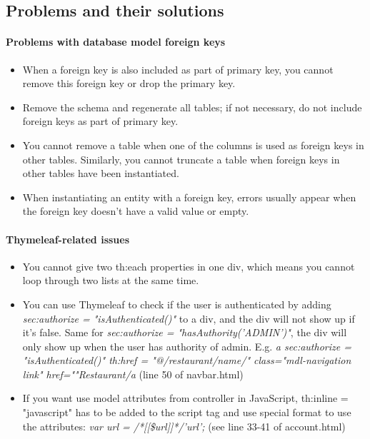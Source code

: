 \documentclass[12pt]{article}
\begin{document}
\subsection{Problems and their solutions}
\paragraph{Problems with database model foreign keys}
\begin{itemize}
	\item When a foreign key is also included as part of primary key, you cannot remove this foreign key or drop the primary key.
	\item Remove the schema and regenerate all tables; if not necessary, do not include foreign keys as part of primary key.
	\item You cannot remove a table when one of the columns is used as foreign keys in other tables. Similarly, you cannot truncate a table when foreign keys in other tables have been instantiated.
	\item When instantiating an entity with a foreign key, errors usually appear when the foreign key doesn't have a valid value or empty.
\end{itemize}

\paragraph{Thymeleaf-related issues}
\begin{itemize}
	\item You cannot give two th:each properties in one div, which means you cannot loop through two lists at the same time.
	\item You can use Thymeleaf to check if the user is authenticated by adding \textit{sec:authorize = "isAuthenticated()"} to a div, and the div will not show up if it’s false. Same for \textit{sec:authorize = "hasAuthority('ADMIN')"}, the div will only show up when the user has authority of admin. E.g. \textit{\textlangle a sec:authorize = "isAuthenticated()" th:href = "@{/restaurant/name/}" class="mdl-navigation  link" href=""\textrangle Restaurant\textlangle/a\textrangle } (line 50 of navbar.html)
	\item If you want use model attributes from controller in JavaScript, th:inline = "javascript" has to be added to the script tag and use special format to use the attributes: \textit{var url = /*[[\${url}]]*/'url';} (see line 33-41 of account.html)
\end{itemize}
\end{document}
